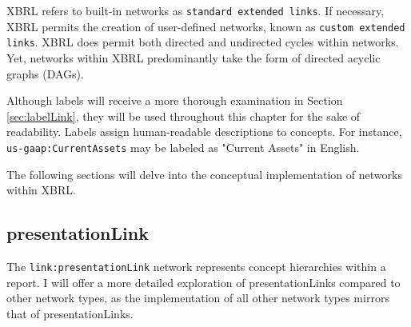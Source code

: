 
XBRL refers to built-in networks as \texttt{standard extended links}.
If necessary, XBRL permits the creation of user-defined networks, known as \texttt{custom extended links}\cite{xbrl21_terminology}.
XBRL does permit both directed and undirected cycles within networks.
Yet, networks within XBRL predominantly take the form of directed acyclic graphs (DAGs).

Although labels will receive a more thorough examination in Section \ref{sec:labelLink}, they will be used throughout this chapter for the sake of readability.
Labels assign human-readable descriptions to concepts. For instance, \texttt{us-gaap:CurrentAssets} may be labeled as "Current Assets" in English.

The following sections will delve into the conceptual implementation of networks within XBRL.


\subsection{presentationLink}



The \texttt{link:presentationLink} network represents concept hierarchies within a report.
I will offer a more detailed exploration of presentationLinks compared to other network types,
as the implementation of all other network types mirrors that of presentationLinks.

